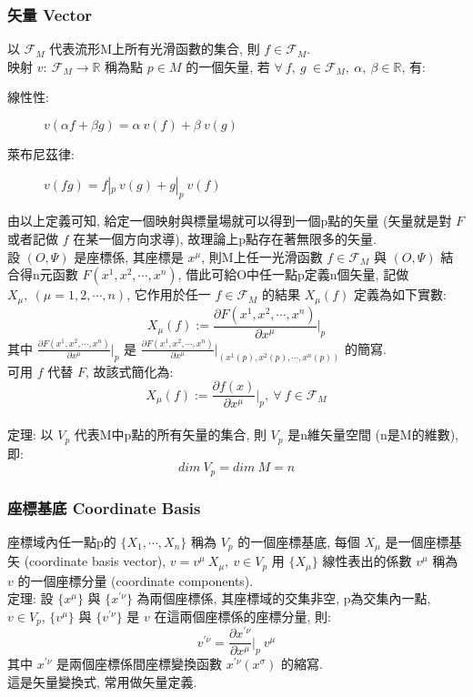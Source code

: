 \documentclass{article}
\begin{document}
\begin{CJK}{UTF8}{bsmi}
\subsubsection{矢量 Vector}
以 $\mathscr{F}_M$ 代表流形M上所有光滑函數的集合, 則 $f \in \mathscr{F}_M$.
\\映射 $v: \ \mathscr{F}_M \rightarrow \mathbb{R}$ 稱為點 $p\in M$ 的一個矢量, 若 $\forall\ f, \ g\ \in \mathscr{F}_M,\ \alpha,\ \beta \in \mathbb{R}$, 有:
\begin{description}
  \item[線性性:]$v(\alpha f+\beta g)=\alpha\  v(f)+\beta\ v(g)$
  \item[萊布尼茲律:]$v(fg)=f|_p \ v(g)+g|_p \ v(f)$
\end{description}
由以上定義可知, 給定一個映射與標量場就可以得到一個p點的矢量 (矢量就是對 $F$ 或者記做 $f$ 在某一個方向求導), 故理論上p點存在著無限多的矢量.\\
設 $(O,\Psi)$ 是座標係, 其座標是 $x^\mu$, 則M上任一光滑函數 $f\in \mathscr{F}_M$ 與 $(O,\Psi)$ 結合得n元函數 $F(x^1,x^2,\cdots,x^n)$, 借此可給O中任一點p定義n個矢量, 記做 $X_\mu,\ (\mu =1,2,\cdots,n)$, 它作用於任一 $f\in \mathscr{F}_M$ 的結果 $X_\mu(f)$ 定義為如下實數: $$X_\mu(f):=\frac{\partial F(x^1,x^2,\cdots,x^n)}{\partial x^\mu}|_p $$ 其中 $\frac{\partial F(x^1,x^2,\cdots,x^n)}{\partial x^\mu}|_p$ 是 $\frac{\partial F(x^1,x^2,\cdots,x^n)}{\partial x^\mu}|_{(x^1(p),x^2(p),\cdots,x^n(p))}$ 的簡寫.
\\可用 $f$ 代替 $F$, 故該式簡化為:$$X_\mu(f):=\frac{\partial f(x)}{\partial x^\mu}|_p ,\ \forall \ f\in \mathscr{F}_M $$\\

  定理: 以 $V_p$ 代表M中p點的所有矢量的集合, 則 $V_p$ 是n維矢量空間 (n是M的維數),
  即: $$dim\ V_p = dim\ M = n$$


\subsubsection{座標基底 Coordinate Basis}
座標域內任一點p的 $\{X_1,\cdots, X_n\}$ 稱為 $V_p$ 的一個座標基底, 每個 $X_\mu$ 是一個座標基矢 (coordinate basis vector), $v=v^\mu \ X_\mu ,\ v \in V_p$ 用 $\{X_\mu \}$ 線性表出的係數 $v^\mu$ 稱為 $v$ 的一個座標分量 (coordinate components).\\

定理:	 設 $\{ x^{\mu} \}$ 與 $\{ x^{'\nu}\}$ 為兩個座標係, 其座標域的交集非空, p為交集內一點, $v\in V_p$, $\{ v^\mu\}$ 與 $\{ v^{'\nu}\}$ 是 $v$ 在這兩個座標係的座標分量, 則: $$v^{'\nu}=\frac{\partial x^{'\nu}}{\partial x^\mu}|_p \ v^\mu $$
  其中 $x^{'\nu}$ 是兩個座標係間座標變換函數 $x^{'\nu}(x^\sigma)$ 的縮寫.
  \\ 這是矢量變換式, 常用做矢量定義. 

\end{CJK}
\end{document}
